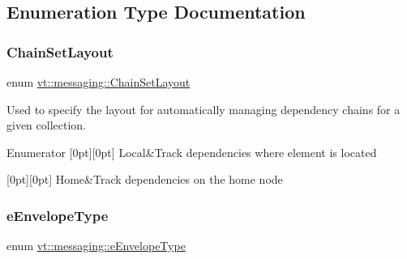 \subsection{Enumeration Type Documentation}
\mbox{\label{namespacevt_1_1messaging_af09e66b5a14598baf7e4b56ad6080ec2}} 
\subsubsection{\texorpdfstring{Chain\+Set\+Layout}{ChainSetLayout}}
{\footnotesize\ttfamily enum \hyperlink{namespacevt_1_1messaging_af09e66b5a14598baf7e4b56ad6080ec2}{vt\+::messaging\+::\+Chain\+Set\+Layout}}



Used to specify the layout for automatically managing dependency chains for a given collection. 

\begin{DoxyEnumFields}{Enumerator}
[0pt][0pt]{}\mbox{\label{namespacevt_1_1messaging_af09e66b5a14598baf7e4b56ad6080ec2a010b35e408e991d56531802665998408}} 
Local&Track dependencies where element is located \\
\hline

[0pt][0pt]{}\mbox{\label{namespacevt_1_1messaging_af09e66b5a14598baf7e4b56ad6080ec2aa465e89bc755d534f1a8202e5f685db8}} 
Home&Track dependencies on the home node \\
\hline

\end{DoxyEnumFields}
\mbox{\label{namespacevt_1_1messaging_a6508ef3a4701a2e6fd0bfe3edcc63a6c}} 
\subsubsection{\texorpdfstring{e\+Envelope\+Type}{eEnvelopeType}}
{\footnotesize\ttfamily enum \hyperlink{namespacevt_1_1messaging_a6508ef3a4701a2e6fd0bfe3edcc63a6c}{vt\+::messaging\+::e\+Envelope\+Type}}



